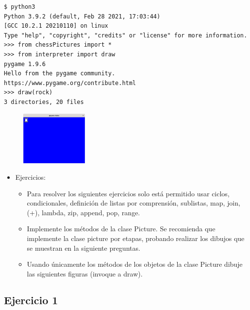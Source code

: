 \documentclass{article}
\begin{document}
	\begin{lstlisting}[style=ascii-tree]
$ python3
Python 3.9.2 (default, Feb 28 2021, 17:03:44)
[GCC 10.2.1 20210110] on linux
Type "help", "copyright", "credits" or "license" for more information.
>>> from chessPictures import *
>>> from interpreter import draw
pygame 1.9.6
Hello from the pygame community. https://www.pygame.org/contribute.html
>>> draw(rock)
3 directories, 20 files
	\end{lstlisting} 
	\begin{figure}[H]
		\centering
		\includegraphics[width=0.3\textwidth,keepaspectratio]{imagenes/pygame_rock.png}
	\end{figure}
	
	\begin{itemize}
		\item Ejercicios:
		\begin{itemize}
			\item Para resolver los siguientes ejercicios solo está permitido usar ciclos, condicionales, definición de listas por comprensión, sublistas, map, join, (+), lambda, zip, append, pop, range.
			\item Implemente los métodos de la clase Picture. Se recomienda que implemente la clase picture por etapas, probando realizar los dibujos que se muestran en la siguiente preguntas.
			\item Usando  únicamente los métodos de los objetos de la clase Picture dibuje las siguientes figuras (invoque a draw).
		\end{itemize}
	\end{itemize}
	\clearpage
	
	\subsection{Ejercicio 1}
	
\end{document}
